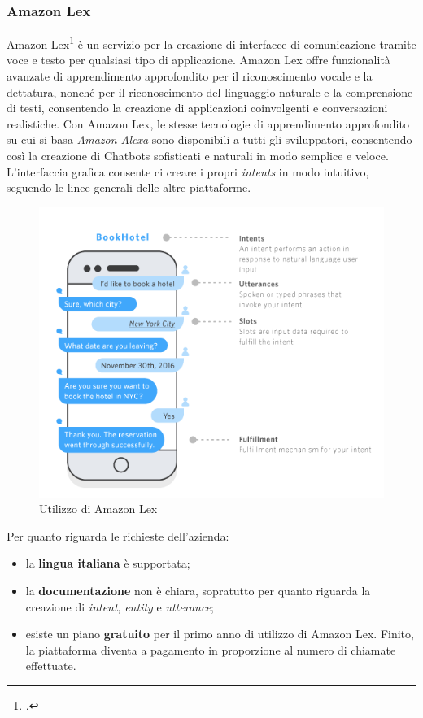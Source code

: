 \subsubsection{Amazon Lex}
Amazon Lex\footcite{lex} è un servizio per la creazione di interfacce di comunicazione tramite voce e testo per qualsiasi tipo di applicazione. Amazon Lex offre funzionalità avanzate di apprendimento approfondito per il riconoscimento vocale e la dettatura, nonché per il riconoscimento del linguaggio naturale e la comprensione di testi, consentendo la creazione di applicazioni coinvolgenti e conversazioni realistiche. Con Amazon Lex, le stesse tecnologie di apprendimento approfondito su cui si basa \emph{Amazon Alexa} sono disponibili a tutti gli sviluppatori, consentendo così la creazione di \glspl{Chatbot} sofisticati e naturali in modo semplice e veloce.\\
L'interfaccia grafica consente ci creare i propri \emph{intents} in modo intuitivo, seguendo le linee generali delle altre piattaforme.
\begin{figure}[!h]
	\centering
	\includegraphics[scale=0.5]{../Immagini/lex_example.png}
	\caption{Utilizzo di Amazon Lex}
\end{figure}

Per quanto riguarda le richieste dell'azienda:
\begin{itemize}
	\item la \textbf{lingua italiana} è supportata;
	\item la \textbf{documentazione} non è chiara, sopratutto per quanto riguarda la creazione di \emph{intent}, \emph{entity} e \emph{utterance};
	\item esiste un piano \textbf{gratuito} per il primo anno di utilizzo di Amazon Lex. Finito, la piattaforma diventa a pagamento in proporzione al numero di chiamate effettuate.
\end{itemize}

